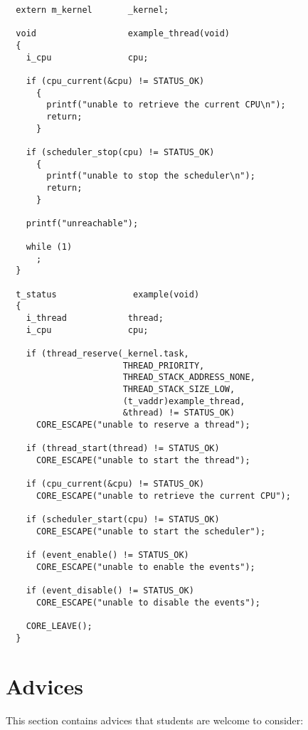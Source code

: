 \begin{verbatim}
  extern m_kernel       _kernel;

  void                  example_thread(void)
  {
    i_cpu               cpu;

    if (cpu_current(&cpu) != STATUS_OK)
      {
        printf("unable to retrieve the current CPU\n");
        return;
      }

    if (scheduler_stop(cpu) != STATUS_OK)
      {
        printf("unable to stop the scheduler\n");
        return;
      }

    printf("unreachable");

    while (1)
      ;
  }

  t_status               example(void)
  {
    i_thread            thread;
    i_cpu               cpu;

    if (thread_reserve(_kernel.task,
                       THREAD_PRIORITY,
                       THREAD_STACK_ADDRESS_NONE,
                       THREAD_STACK_SIZE_LOW,
                       (t_vaddr)example_thread,
                       &thread) != STATUS_OK)
      CORE_ESCAPE("unable to reserve a thread");

    if (thread_start(thread) != STATUS_OK)
      CORE_ESCAPE("unable to start the thread");

    if (cpu_current(&cpu) != STATUS_OK)
      CORE_ESCAPE("unable to retrieve the current CPU");

    if (scheduler_start(cpu) != STATUS_OK)
      CORE_ESCAPE("unable to start the scheduler");

    if (event_enable() != STATUS_OK)
      CORE_ESCAPE("unable to enable the events");

    if (event_disable() != STATUS_OK)
      CORE_ESCAPE("unable to disable the events");

    CORE_LEAVE();
  }
\end{verbatim}

%
%

\section{Advices}

This section contains advices that students are welcome to consider:

